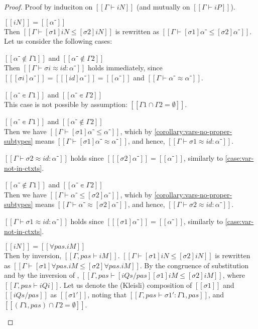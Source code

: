 \lemmaSubtIndDisjSubst*
\begin{proof}
  Proof by induciton on $[[Γ ⊢ iN]]$ (and mutually on $[[Γ ⊢ iP]]$).
  \begin{caseof}
    \item $[[iN]] = [[α⁻]]$\\
      Then $[[Γ ⊢ [σ1]iN ≤ [σ2]iN]]$ is rewritten as $[[Γ ⊢ [σ1]α⁻ ≤ [σ2]α⁻]]$.
      Let us consider the following cases:
      \begin{caseof}
      \item $[[α⁻ ∉ Γ1]]$ and $[[α⁻ ∉ Γ2]]$ \label{case:var-not-in-ctxts}\\
        Then $[[Γ ⊢ σi ≈ id : {α⁻}]]$ holds immediately,
        since $[[ [σi] α⁻]] = [[ [id] α⁻]] = [[α⁻]]$ and
        $[[Γ ⊢ α⁻ ≈ α⁻]]$.
      \item $[[α⁻ ∊ Γ1]]$ and $[[α⁻ ∊ Γ2]]$\\
        This case is not possible by assumption: $[[Γ1 ∩ Γ2= ∅]]$.
      \item $[[α⁻ ∊ Γ1]]$ and $[[α⁻ ∉ Γ2]]$\\
        Then we have $[[Γ ⊢ [σ1]α⁻ ≤ α⁻]]$,
        which by \cref{corollary:vars-no-proper-subtypes} means $[[Γ ⊢ [σ1]α⁻ ≈ α⁻]]$,
        and hence, $[[Γ ⊢ σ1 ≈ id : {α⁻}]]$.

        $[[Γ ⊢ σ2 ≈ id : {α⁻}]]$ holds since $[[ [σ2]α⁻ ]] = [[α⁻]]$,
        similarly to \cref{case:var-not-in-ctxts}.

      \item $[[α⁻ ∉ Γ1]]$ and $[[α⁻ ∊ Γ2]]$\\
        Then we have $[[Γ ⊢ α⁻ ≤ [σ2]α⁻]]$,
        which by \cref{corollary:vars-no-proper-subtypes} means $[[Γ ⊢ α⁻ ≈ [σ2]α⁻]]$,
        and hence, $[[Γ ⊢ σ2 ≈ id : {α⁻}]]$.

        $[[Γ ⊢ σ1 ≈ id : {α⁻}]]$ holds since $[[ [σ1]α⁻ ]] = [[α⁻]]$,
        similarly to \cref{case:var-not-in-ctxts}.
      \end{caseof}
  \item $[[iN]] = [[∀pas.iM]]$\\
    Then by inversion, $[[Γ, pas ⊢ iM]]$.
    $[[Γ ⊢ [σ1]iN ≤ [σ2]iN]]$ is rewritten as $[[Γ ⊢ [σ1]∀pas.iM ≤ [σ2]∀pas.iM]]$.
    By the congruence of substitution and by the inversion of
    , $[[Γ, pas ⊢ [iQs/pas][σ1]iM ≤ [σ2]iM]]$,
    where $[[Γ, pas ⊢ iQi]]$.
    Let us denote the (Kleisli) composition of $[[σ1]]$ and $[[iQs/pas]]$ as
    $[[σ1']]$, noting that $[[Γ, pas ⊢ σ1' : Γ1, pas]]$,
    and $[[(Γ1, pas) ∩ Γ2 = ∅]]$.


\end{caseof}
\end{proof}
